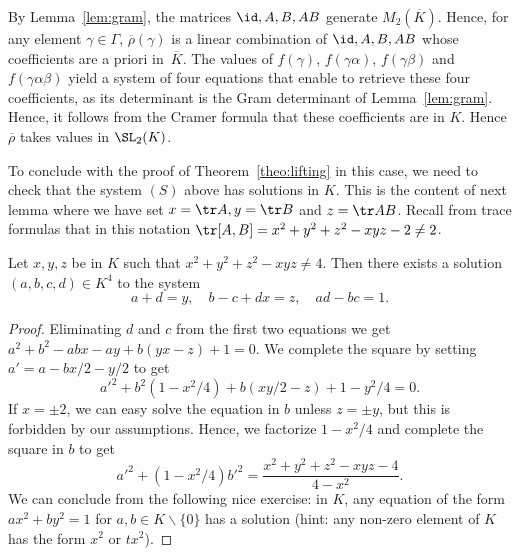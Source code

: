 By Lemma~\ref{lem:gram}, the matrices $\id,A,B,AB$ generate
$M_2(\overline{K})$. Hence, for any element $\gamma\in\Gamma$,
$\overline{\rho}(\gamma)$ is a linear combination of $\id,A,B,AB$ whose
coefficients are a priori in~$\overline{K}$. The values of $f(\gamma)$,
$f(\gamma \alpha)$, $f(\gamma\beta)$ and $f(\gamma\alpha\beta)$ yield a system of four equations that enable to retrieve these four coefficients,
as its determinant is the Gram determinant of Lemma~\ref{lem:gram}.
Hence, it follows from the Cramer formula that these coefficients are in
$K$. Hence $\overline{\rho}$ takes values in $\SL_2(K)$.

To conclude with the proof of Theorem~\ref{theo:lifting} in this case, we
need to check that the system $(S)$ above has solutions in $K$. This is
the content of next lemma where we have set $x=\tr A, y=\tr B$ and
$z=\tr AB$. Recall from trace formulas that in this notation
$\tr [A,B]=x^2+y^2+z^2-xyz-2\ne 2$.

\begin{lemma}\label{ilyaunesolution}
Let $x,y,z$ be in $K$ such that $x^2+y^2+z^2-xyz\ne 4$. Then there exists
a solution $(a,b,c,d)\in K^4$ to the system
\[ a+d=y,\quad b-c+dx=z,\quad ad-bc=1. \]
\end{lemma}
\begin{proof}
Eliminating $d$ and $c$ from the first two equations we get
$a^2+b^2-abx-ay+b(yx-z)+1=0$. We complete the square by setting
$a'=a-bx/2-y/2$ to get
\[ a'^2+b^2(1-x^2/4)+b(xy/2-z)+1-y^2/4=0. \]
If $x=\pm 2$, we can easy solve the equation in $b$ unless $z=\pm y$,
but this is forbidden by our assumptions. Hence, we factorize $1-x^2/4$
and complete the square in $b$ to get
\[
a'^2+(1-x^2/4)b'^2=\frac{x^2+y^2+z^2-xyz-4}{4-x^2}.
\]
We can conclude from the following nice exercise: in $K$, any equation of
the form $ax^2+by^2=1$ for $a,b\in K\smallsetminus\{0\}$ has a solution
(hint: any non-zero element of $K$ has the form $x^2$ or $tx^2$).
\end{proof}

